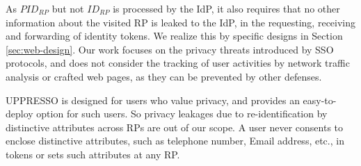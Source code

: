 As $PID_{RP}$ but not $ID_{RP}$ is processed by the IdP,
it also requires that no other information about the visited RP is leaked to the IdP,
 in the requesting, receiving and forwarding of identity tokens.
We realize this by specific designs in Section \ref{sec:web-design}.
Our work focuses on the privacy threats introduced by SSO protocols, and does not consider the tracking of user activities by network traffic analysis or crafted web pages, as they can be prevented by other defenses.


UPPRESSO is designed for users who value privacy,
        and provides an easy-to-deploy option for such users.
So privacy leakages due to re-identification by distinctive attributes across RPs are out of our scope.
A user never consents to enclose distinctive attributes, such as telephone number, Email address, etc., in tokens or sets such attributes at any RP.
